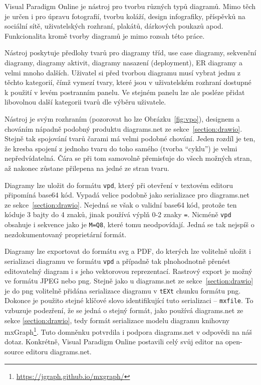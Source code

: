 Visual Paradigm Online je nástroj pro tvorbu různých typů diagramů.
Mimo těch je určen i pro úpravu fotografií, tvorbu koláží, design infografiky, příspěvků na sociální sítě, uživatelských rozhraní, plakátů, dárkových poukazů apod.
Funkcionalita kromě tvorby diagramů je mimo rozsah této práce.

Nástroj poskytuje předlohy tvarů pro diagramy tříd, use case diagramy, sekvenční diagramy, diagramy aktivit, diagramy nasazení (deployment), ER diagramy a velmi mnoho dalších.
Uživatel si před tvorbou diagramu musí vybrat jednu z těchto kategorií, čímž vymezí tvary, které jsou v uživatelském rozhraní dostupné k použití v levém postranním panelu.
Ve stejném panelu lze ale posléze přidat libovolnou další kategorii tvarů dle výběru uživatele.

Nástroj je svým rozhraním (pozorovat ho lze Obrázku~\ref{fig:vpo}), designem a chováním nápadně podobný produktu diagrams.net ze sekce~\ref{section:drawio}.
Stejně tak spojování tvarů čarami má velmi podobné chování.
Jeden rozdíl je ten, že kresba spojení z jednoho tvaru do toho samého (tvorba \enquote{cyklu}) je velmi nepředvídatelná.
Čára se při tom samovolně přemisťuje do všech možných stran, až nakonec zůstane přilepena na jedné ze stran tvaru.

Diagramy lze uložit do formátu \texttt{vpd}, který při otevření v textovém editoru připomíná base64 kód.
Vypadá velice podobně jako serializace pro diagrams.net ze sekce~\ref{section:drawio}.
Nejedná se však o validní base64 kód, protože ten kóduje 3 bajty do 4 znaků, jinak používá výplň 0-2 znaky \texttt{=}.
Nicméně \texttt{vpd} obsahuje i sekvence jako je \texttt{M=Q8}, které tomu neodpovídají.
Jedná se tak nejspíš o nezdokumentovaný proprietární formát.

Diagramy lze exportovat do formátu \acrshort{svg} a PDF, do kterých lze volitelně uložit i serializaci diagramu ve formátu \texttt{vpd} a případně tak plnohodnotně přenést editovatelný diagram i s jeho vektorovou reprezentací.
Rastrový export je možný ve formátu JPEG nebo \acrshort{png}.
Stejně jako u diagrams.net ze sekce~\ref{section:drawio} je do \acrshort{png} volitelně přidána serializace diagramu v \texttt{tEXt} chunku formátu \acrshort{png}.
Dokonce je použito stejné klíčové slovo identifikující tuto serializaci -- \texttt{mxfile}.
To vzbuzuje podezření, že se jedná o stejný formát, jako používá diagrams.net ze sekce \ref{section:drawio}, tedy formát serializace modelu diagramu knihovny mxGraph\footnote{\url{https://jgraph.github.io/mxgraph/}}.
Tuto domněnku potvrdila i podpora diagrams.net v odpovědi na náš dotaz.
Konkrétně, Visual Paradigm Online postavili celý svůj editor na open-source editoru diagrams.net.

